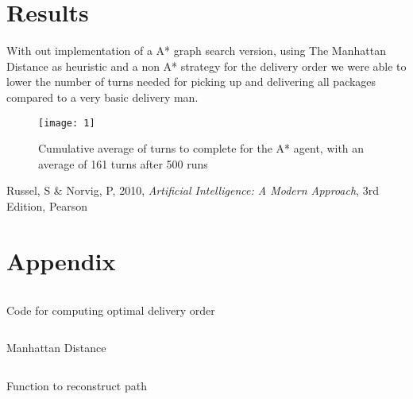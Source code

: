 \documentclass[a4paper]{article}
\begin{document}
\section{Results}
With out implementation of a A* graph search version, using The Manhattan Distance as heuristic and a non A* strategy for the delivery order we were able to lower the number of turns needed for picking up and delivering all packages compared to a very basic delivery man.
\begin{figure}[H]
  \centering
    \texttt{[image: 1]}
    \caption{Cumulative average of turns to complete for the A* agent, with an average of 161 turns after 500 runs}
    \label{fig:opti}
\end{figure}

\begin{thebibliography}{9}
    Russel, S \& Norvig, P, 2010, \emph{Artificial Intelligence: A Modern Approach}, 3rd Edition, Pearson
\end{thebibliography}
\section*{Appendix}
\begin{listing}[H]
  \vspace*{-10pt}
  \inputminted[mathescape,linenos,numbersep=5pt,firstline=173,lastline=192,
      framesep=4pt,frame=single,fontsize=\footnotesize,
      samepage=true,tabsize=2,numbers=left]{R}{smartDM.R}
  \vspace*{-16pt}
  \caption{Code for computing optimal delivery order}
  \label{code:computeOptimalOrder}
\end{listing}

\begin{listing}[H]
  \vspace*{-10pt}
  \inputminted[mathescape,linenos,numbersep=5pt,firstline=167,lastline=170,
      framesep=4pt,frame=single,fontsize=\footnotesize,
      samepage=true,tabsize=2,numbers=left]{R}{smartDM.R}
  \vspace*{-16pt}
  \caption{Manhattan Distance}
  \label{code:manhattan}
\end{listing}

\begin{listing}[H]
  \vspace*{-10pt}
  \inputminted[mathescape,linenos,numbersep=5pt,firstline=63,lastline=93,
      framesep=4pt,frame=single,fontsize=\footnotesize,
      samepage=true,tabsize=2,numbers=left]{R}{smartDM.R}
  \vspace*{-16pt}
  \caption{Function to reconstruct path}
  \label{code:reconstruct}
\end{listing}
\end{document}
